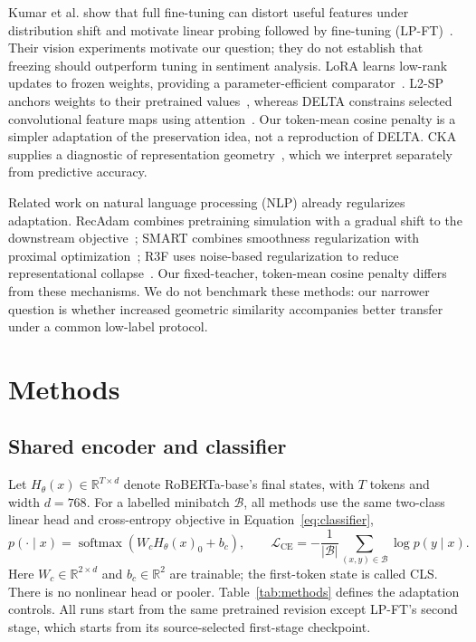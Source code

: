 \documentclass[a4paper,10pt]{article}
\begin{document}
Kumar et al. show that full fine-tuning can distort useful features under distribution shift and motivate linear probing followed by fine-tuning (LP-FT)~\cite{lpft}. Their vision experiments motivate our question; they do not establish that freezing should outperform tuning in sentiment analysis. LoRA learns low-rank updates to frozen weights, providing a parameter-efficient comparator~\cite{lora}. L2-SP anchors weights to their pretrained values~\cite{l2sp}, whereas DELTA constrains selected convolutional feature maps using attention~\cite{delta}. Our token-mean cosine penalty is a simpler adaptation of the preservation idea, not a reproduction of DELTA. CKA supplies a diagnostic of representation geometry~\cite{cka}, which we interpret separately from predictive accuracy.

Related work on natural language processing (NLP) already regularizes adaptation. RecAdam combines pretraining simulation with a gradual shift to the downstream objective~\cite{recadam}; SMART combines smoothness regularization with proximal optimization~\cite{smart}; R3F uses noise-based regularization to reduce representational collapse~\cite{r3f}. Our fixed-teacher, token-mean cosine penalty differs from these mechanisms. We do not benchmark these methods: our narrower question is whether increased geometric similarity accompanies better transfer under a common low-label protocol.

\clearpage
\section{Methods}\label{sec:methods}
\subsection{Shared encoder and classifier}
Let $H_\theta(x)\in\mathbb{R}^{T\times d}$ denote RoBERTa-base's final states, with $T$ tokens and width $d=768$. For a labelled minibatch $\mathcal B$, all methods use the same two-class linear head and cross-entropy objective in Equation~\ref{eq:classifier},
\begin{equation}
 p(\cdot\mid x)=\operatorname{softmax}(W_c H_\theta(x)_0+b_c),\qquad
 \mathcal{L}_{\mathrm{CE}}=-\frac{1}{|\mathcal B|}\sum_{(x,y)\in\mathcal B}\log p(y\mid x).
\label{eq:classifier}
\end{equation}
Here $W_c\in\mathbb R^{2\times d}$ and $b_c\in\mathbb R^2$ are trainable; the first-token state is called CLS. There is no nonlinear head or pooler. Table~\ref{tab:methods} defines the adaptation controls. All runs start from the same pretrained revision except LP-FT's second stage, which starts from its source-selected first-stage checkpoint.
\end{document}
